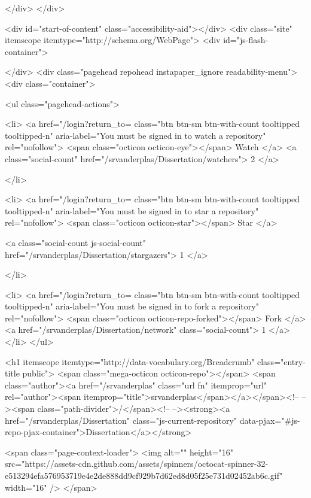   </div>
</div>



      <div id="start-of-content" class="accessibility-aid"></div>
          <div class="site" itemscope itemtype="http://schema.org/WebPage">
    <div id="js-flash-container">
      
    </div>
    <div class="pagehead repohead instapaper_ignore readability-menu">
      <div class="container">
        
<ul class="pagehead-actions">

  <li>
      <a href="/login?return_to=%
    class="btn btn-sm btn-with-count tooltipped tooltipped-n"
    aria-label="You must be signed in to watch a repository" rel="nofollow">
    <span class="octicon octicon-eye"></span>
    Watch
  </a>
  <a class="social-count" href="/srvanderplas/Dissertation/watchers">
    2
  </a>

  </li>

  <li>
      <a href="/login?return_to=%
    class="btn btn-sm btn-with-count tooltipped tooltipped-n"
    aria-label="You must be signed in to star a repository" rel="nofollow">
    <span class="octicon octicon-star"></span>
    Star
  </a>

    <a class="social-count js-social-count" href="/srvanderplas/Dissertation/stargazers">
      1
    </a>

  </li>

    <li>
      <a href="/login?return_to=%
        class="btn btn-sm btn-with-count tooltipped tooltipped-n"
        aria-label="You must be signed in to fork a repository" rel="nofollow">
        <span class="octicon octicon-repo-forked"></span>
        Fork
      </a>
      <a href="/srvanderplas/Dissertation/network" class="social-count">
        1
      </a>
    </li>
</ul>

        <h1 itemscope itemtype="http://data-vocabulary.org/Breadcrumb" class="entry-title public">
          <span class="mega-octicon octicon-repo"></span>
          <span class="author"><a href="/srvanderplas" class="url fn" itemprop="url" rel="author"><span itemprop="title">srvanderplas</span></a></span><!--
       --><span class="path-divider">/</span><!--
       --><strong><a href="/srvanderplas/Dissertation" class="js-current-repository" data-pjax="#js-repo-pjax-container">Dissertation</a></strong>

          <span class="page-context-loader">
            <img alt="" height="16" src="https://assets-cdn.github.com/assets/spinners/octocat-spinner-32-e513294efa576953719e4e2de888dd9cf929b7d62ed8d05f25e731d02452ab6c.gif" width="16" />
          </span>

